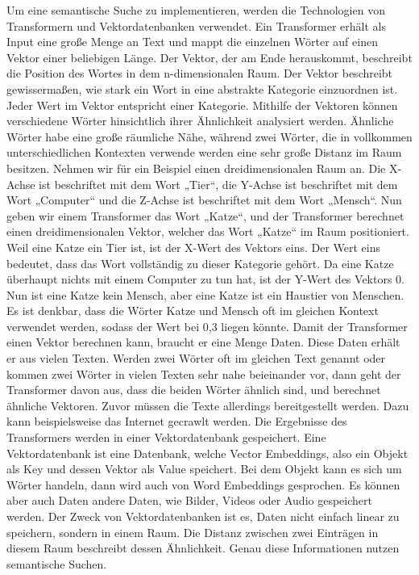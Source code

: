 Um eine semantische Suche zu implementieren, werden die Technologien von Transformern und Vektordatenbanken verwendet.
Ein Transformer erhält als Input eine große Menge an Text und mappt die einzelnen Wörter auf einen Vektor einer beliebigen Länge.
Der Vektor, der am Ende herauskommt, beschreibt die Position des Wortes in dem n-dimensionalen Raum.
Der Vektor beschreibt gewissermaßen, wie stark ein Wort in eine abstrakte Kategorie einzuordnen ist.
Jeder Wert im Vektor entspricht einer Kategorie.
Mithilfe der Vektoren können verschiedene Wörter hinsichtlich ihrer Ähnlichkeit analysiert werden.
Ähnliche Wörter habe eine große räumliche Nähe, während zwei Wörter, die in vollkommen unterschiedlichen Kontexten verwende werden eine sehr große Distanz im Raum besitzen.
Nehmen wir für ein Beispiel einen dreidimensionalen Raum an.
Die X-Achse ist beschriftet mit dem Wort „Tier“, die Y-Achse ist beschriftet mit dem Wort „Computer“ und die Z-Achse ist beschriftet mit dem Wort „Mensch“.
Nun geben wir einem Transformer das Wort „Katze“, und der Transformer berechnet einen dreidimensionalen Vektor, welcher das Wort „Katze“ im Raum positioniert.
Weil eine Katze ein Tier ist, ist der X-Wert des Vektors eins.
Der Wert eins bedeutet, dass das Wort vollständig zu dieser Kategorie gehört.
Da eine Katze überhaupt nichts mit einem Computer zu tun hat, ist der Y-Wert des Vektors 0.\\

Nun ist eine Katze kein Mensch, aber eine Katze ist ein Haustier von Menschen.
Es ist denkbar, dass die Wörter Katze und Mensch oft im gleichen Kontext verwendet werden, sodass der Wert bei 0,3 liegen könnte.
Damit der Transformer einen Vektor berechnen kann, braucht er eine Menge Daten.
Diese Daten erhält er aus vielen Texten.
Werden zwei Wörter oft im gleichen Text genannt oder kommen zwei Wörter in vielen Texten sehr nahe beieinander vor, dann geht der Transformer davon aus, dass die beiden Wörter ähnlich sind, und berechnet ähnliche Vektoren.
Zuvor müssen die Texte allerdings bereitgestellt werden.
Dazu kann beispielsweise das Internet gecrawlt werden.
Die Ergebnisse des Transformers werden in einer Vektordatenbank gespeichert.
Eine Vektordatenbank ist eine Datenbank, welche Vector Embeddings, also ein Objekt als Key und dessen Vektor als Value speichert.
Bei dem Objekt kann es sich um Wörter handeln, dann wird auch von Word Embeddings gesprochen.
Es können aber auch Daten andere Daten, wie Bilder, Videos oder Audio gespeichert werden.
Der Zweck von Vektordatenbanken ist es, Daten nicht einfach linear zu speichern, sondern in einem Raum.
Die Distanz zwischen zwei Einträgen in diesem Raum beschreibt dessen Ähnlichkeit.
Genau diese Informationen nutzen semantische Suchen.

